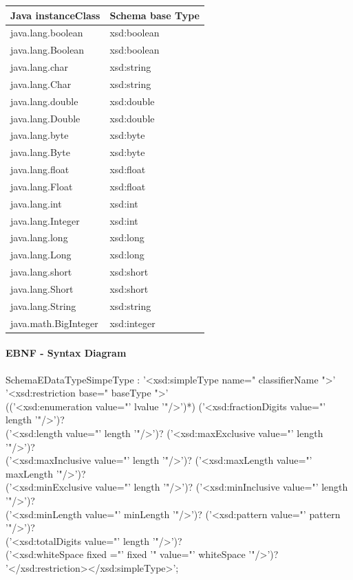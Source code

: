 \documentclass[11pt,a4paper]{article}
\begin{document}
\begin{center}
\begin{tabular}{|l|l|}
\hline
Java instanceClass & Schema base Type \\
\hline
java.lang.boolean     & xsd:boolean \\
java.lang.Boolean    & xsd:boolean \\
java.lang.char          & xsd:string \\
java.lang.Char          & xsd:string \\
java.lang.double       & xsd:double \\
java.lang.Double       & xsd:double \\
java.lang.byte         & xsd:byte \\
java.lang.Byte         & xsd:byte \\
java.lang.float   & xsd:float \\
java.lang.Float	         & xsd:float \\
java.lang.int                & xsd:int \\
java.lang.Integer        & xsd:int \\
java.lang.long            & xsd:long \\
java.lang.Long          & xsd:long \\
java.lang.short          & xsd:short \\
java.lang.Short          & xsd:short \\
java.lang.String         & xsd:string \\
java.math.BigInteger & xsd:integer \\
\hline
\end{tabular}
\end{center}


\paragraph{EBNF - Syntax Diagram}
\begin{rail}
SchemaEDataTypeSimpeType : 
'<xsd:simpleType name=" classifierName ">'\\
    '<xsd:restriction base=" baseType  ">' \\
      (('<xsd:enumeration value="' lvalue '"/>')*) 
      ('<xsd:fractionDigits value="' length '"/>')?\\
      ('<xsd:length value="' length '"/>')?
      ('<xsd:maxExclusive value="' length '"/>')?\\
      ('<xsd:maxInclusive value="' length '"/>')?
      ('<xsd:maxLength value="' maxLength '"/>')?\\
      ('<xsd:minExclusive value="' length '"/>')?
      ('<xsd:minInclusive value="' length '"/>')?\\
      ('<xsd:minLength value="' minLength '"/>')?
      ('<xsd:pattern value="' pattern '"/>')? \\ 
      ('<xsd:totalDigits value="' length '"/>')?\\
      ('<xsd:whiteSpace fixed ="' fixed '" value="' whiteSpace '"/>')?\\
    '</xsd:restriction></xsd:simpleType>';
\end{rail}
\end{document}
